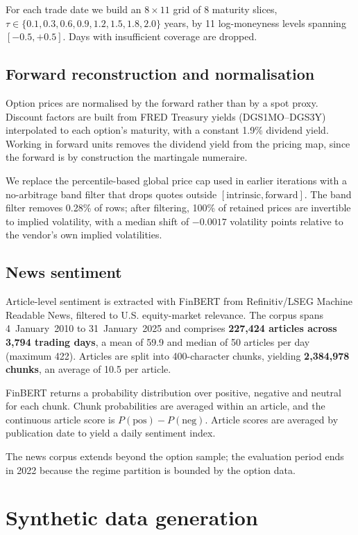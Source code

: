 \documentclass[11pt,a4paper]{article}
\begin{document}
For each trade date we build an $8\times11$ grid of 8 maturity slices,
$\tau \in \{0.1,0.3,0.6,0.9,1.2,1.5,1.8,2.0\}$ years, by 11 log-moneyness levels
spanning $[-0.5,+0.5]$. Days with insufficient coverage are dropped.

\subsection{Forward reconstruction and normalisation}
Option prices are normalised by the forward rather than by a spot proxy.
Discount factors are built from FRED Treasury yields (DGS1MO--DGS3Y)
interpolated to each option's maturity, with a constant 1.9\% dividend yield.
Working in forward units removes the dividend yield from the pricing map, since
the forward is by construction the martingale numeraire.

We replace the percentile-based global price cap used in earlier iterations with
a no-arbitrage band filter that drops quotes outside $[\text{intrinsic},
\text{forward}]$. The band filter removes 0.28\% of rows; after filtering, 100\%
of retained prices are invertible to implied volatility, with a median shift of
$-0.0017$ volatility points relative to the vendor's own implied volatilities.

\subsection{News sentiment}
Article-level sentiment is extracted with FinBERT from Refinitiv/LSEG Machine
Readable News, filtered to U.S. equity-market relevance. The corpus spans
4~January~2010 to 31~January~2025 and comprises \textbf{227{,}424 articles
across 3{,}794 trading days}, a mean of 59.9 and median of 50 articles per day
(maximum 422). Articles are split into 400-character chunks, yielding
\textbf{2{,}384{,}978 chunks}, an average of 10.5 per article.

FinBERT returns a probability distribution over positive, negative and neutral
for each chunk. Chunk probabilities are averaged within an article, and the
continuous article score is $P(\text{pos}) - P(\text{neg})$. Article scores are
averaged by publication date to yield a daily sentiment index.

The news corpus extends beyond the option sample; the evaluation period ends in
2022 because the regime partition is bounded by the option data.

\section{Synthetic data generation}
\end{document}
